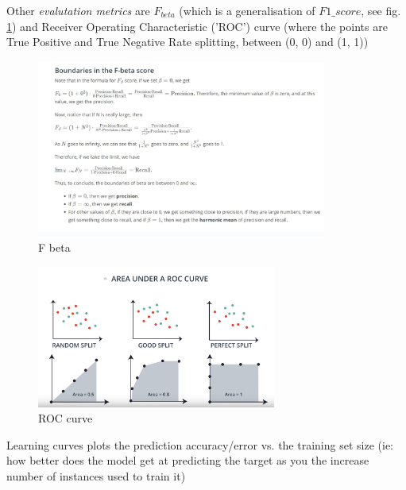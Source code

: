 \documentclass[11pt]{article}
\begin{document}
Other \textit{evalutation metrics} are $F_{beta}$ (which is a generalisation of  $F1\_score$, see fig. \ref{F_beta_boundaries}) and Receiver Operating Characteristic ('ROC') curve (where the points are True Positive and True Negative Rate splitting, between (0, 0) and (1, 1))
\begin{figure}[htbp] 
	\centering
	\includegraphics[width=0.85\textwidth]{pics/F_beta_boundaries}
	\caption{F beta}  
	\label{F_beta_boundaries}
\end{figure}

\begin{figure}[htbp] 
	\centering
	\includegraphics[width=0.7\textwidth]{pics/ROC_curve}
	\caption{ROC curve}  
	\label{ROC_curve}
\end{figure}

Learning curves plots the prediction accuracy/error vs. the training set size (ie: how better does the model get at predicting the target as you the increase number of instances used to train it)
\end{document}
